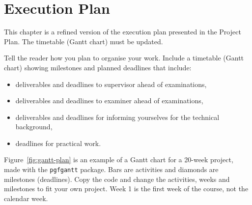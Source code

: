 \chapter{Execution Plan}
\label{chap:plan}
\begin{instructions}
\begin{onlymidterm}
This chapter is a refined version of the execution plan presented in the Project Plan. The timetable (Gantt chart) must be updated.

\end{onlymidterm}
Tell the reader how you plan to organise your work. Include a timetable (Gantt chart) showing milestones and planned deadlines that include:
\begin{itemize}
    \item deliverables and deadlines to supervisor ahead of examinations,
    \item deliverables and deadlines to examiner ahead of examinations,
    \item deliverables and deadlines for informing yourselves for the technical background,
    \item deadlines for practical work.
\end{itemize}
\begin{onlyplan}

Figure~\ref{fig:gantt-plan} is an example of a Gantt chart for a 20-week project, made with the \texttt{pgfgantt} package. Bars are activities and diamonds are milestones (deadlines). Copy the code and change the activities, weeks and milestones to fit your own project. Week 1 is the first week of the course, not the calendar week.


\end{onlyplan}
\end{instructions}

